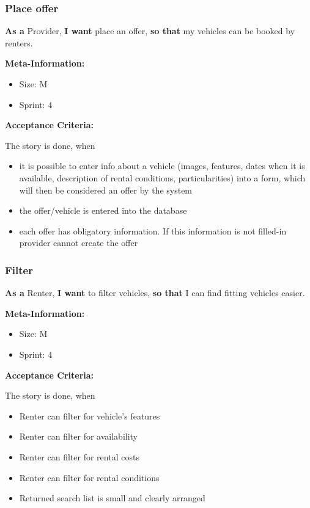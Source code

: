 \subsubsection{Place offer}

\textbf{As a} Provider,\hfill\break
\textbf{I want} place an offer,\hfill\break
\textbf{so that} my vehicles can be booked by renters.

\textbf{Meta-Information:}
\begin{itemize}
    \item Size: M
    \item Sprint: 4
\end{itemize}

\textbf{Acceptance Criteria:}

The story is done, when
\begin{itemize}
    \item it is possible to enter info about a vehicle (images, features, dates when it is available, description of rental conditions, particularities) into a form, which will then be considered an offer by the system
    \item the offer/vehicle is entered into the database
    \item each offer has obligatory information. If this information is not filled-in provider cannot create the offer
\end{itemize}


\subsubsection{Filter}

\textbf{As a} Renter,\hfill\break
\textbf{I want} to filter vehicles,\hfill\break
\textbf{so that} I can find fitting vehicles easier.

\textbf{Meta-Information:}
\begin{itemize}
    \item Size: M
    \item Sprint: 4
\end{itemize}

\textbf{Acceptance Criteria:}

The story is done, when
\begin{itemize}
    \item Renter can filter for vehicle's features
    \item Renter can filter for availability
    \item Renter can filter for rental costs
    \item Renter can filter for rental conditions
    \item Returned search list is small and clearly arranged
\end{itemize}


